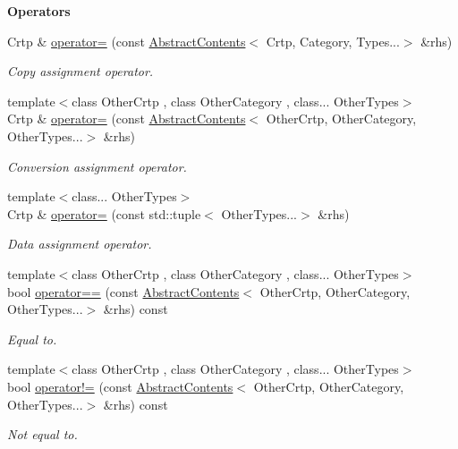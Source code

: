 \begin{Indent}{\bf Operators}\par
\begin{DoxyCompactItemize}
\item 
Crtp \& \hyperlink{classmagrathea_1_1AbstractContents_ae0ecda2afd2f1c76d2223bf8505bc218}{operator=} (const \hyperlink{classmagrathea_1_1AbstractContents}{Abstract\-Contents}$<$ Crtp, Category, Types...$>$ \&rhs)
\begin{DoxyCompactList}\small\item\em Copy assignment operator. \end{DoxyCompactList}\item 
{\footnotesize template$<$class Other\-Crtp , class Other\-Category , class... Other\-Types$>$ }\\Crtp \& \hyperlink{classmagrathea_1_1AbstractContents_a508403432031243ce3ad42cfcf0908fa}{operator=} (const \hyperlink{classmagrathea_1_1AbstractContents}{Abstract\-Contents}$<$ Other\-Crtp, Other\-Category, Other\-Types...$>$ \&rhs)
\begin{DoxyCompactList}\small\item\em Conversion assignment operator. \end{DoxyCompactList}\item 
{\footnotesize template$<$class... Other\-Types$>$ }\\Crtp \& \hyperlink{classmagrathea_1_1AbstractContents_afbc02ebe68c5689d920b63790b9f4668}{operator=} (const std\-::tuple$<$ Other\-Types...$>$ \&rhs)
\begin{DoxyCompactList}\small\item\em Data assignment operator. \end{DoxyCompactList}\item 
{\footnotesize template$<$class Other\-Crtp , class Other\-Category , class... Other\-Types$>$ }\\bool \hyperlink{classmagrathea_1_1AbstractContents_a1637c13af00b04984f3f0ff58081ef19}{operator==} (const \hyperlink{classmagrathea_1_1AbstractContents}{Abstract\-Contents}$<$ Other\-Crtp, Other\-Category, Other\-Types...$>$ \&rhs) const 
\begin{DoxyCompactList}\small\item\em Equal to. \end{DoxyCompactList}\item 
{\footnotesize template$<$class Other\-Crtp , class Other\-Category , class... Other\-Types$>$ }\\bool \hyperlink{classmagrathea_1_1AbstractContents_a941342687552e29ee1855c0d3f0dbd61}{operator!=} (const \hyperlink{classmagrathea_1_1AbstractContents}{Abstract\-Contents}$<$ Other\-Crtp, Other\-Category, Other\-Types...$>$ \&rhs) const 
\begin{DoxyCompactList}\small\item\em Not equal to. \end{DoxyCompactList}\end{DoxyCompactItemize}
\end{Indent}

